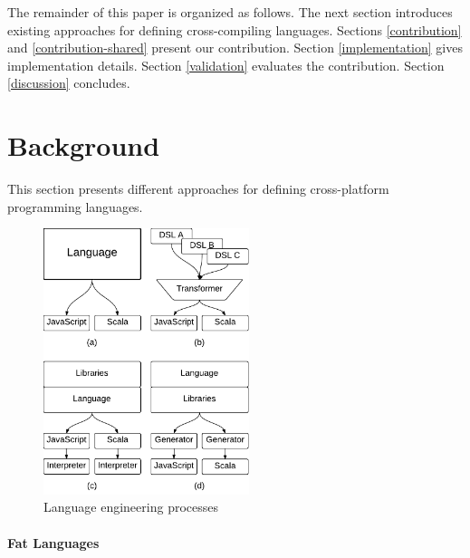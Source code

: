 \documentclass[preprint]{sigplanconf}
\begin{document}
The remainder of this paper is organized as follows. The next section introduces existing approaches for defining
cross-compiling languages. Sections \ref{contribution} and \ref{contribution-shared} present our contribution.
Section \ref{implementation} gives implementation details. Section \ref{validation} evaluates the contribution.
Section \ref{discussion} concludes.

\section{Background}

This section presents different approaches for defining cross-platform programming languages.

\begin{figure}
\begin{center}
\includegraphics[width=6cm]{langs.pdf}
\end{center}
\caption{Language engineering processes}
\label{langs}
\end{figure}

\paragraph{Fat Languages}
\end{document}

